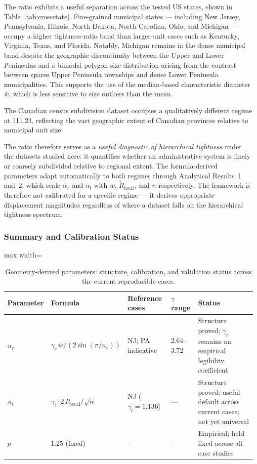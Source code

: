 \documentclass[12pt, a4paper]{article}
\numberwithin{equation}{section}
\begin{document}
The ratio exhibits a useful separation across the tested US states, shown in Table~\ref{tab:crossstate}. Fine-grained municipal states --- including New Jersey, Pennsylvania, Illinois, North Dakota, North Carolina, Ohio, and Michigan --- occupy a higher tightness-ratio band than larger-unit cases such as Kentucky, Virginia, Texas, and Florida. Notably, Michigan remains in the dense municipal band despite the geographic discontinuity between the Upper and Lower Peninsulas and a bimodal polygon size distribution arising from the contrast between sparse Upper Peninsula townships and dense Lower Peninsula municipalities. This supports the use of the median-based characteristic diameter $\bar{w}$, which is less sensitive to size outliers than the mean.

The Canadian census subdivision dataset occupies a qualitatively different regime at 111.23, reflecting the vast geographic extent of Canadian provinces relative to municipal unit size.

The ratio therefore serves as a \emph{useful diagnostic of hierarchical tightness} under the datasets studied here: it quantifies whether an administrative system is finely or coarsely subdivided relative to regional extent. The formula-derived parameters adapt automatically to both regimes through Analytical Results~1 and~2, which scale $\alpha_r$ and $\alpha_l$ with $\bar{w}$, $\widetilde{R}_{\text{local}}$, and $\bar{n}$ respectively. The framework is therefore not calibrated for a specific regime --- it derives appropriate displacement magnitudes regardless of where a dataset falls on the hierarchical tightness spectrum.

\subsubsection{Summary and Calibration Status}

\begin{table}[h]
\centering
\caption{Geometry-derived parameters: structure, calibration, and validation status across the current reproducible cases.}
\label{tab:derived}
\begin{adjustbox}{max width=\textwidth}
\begin{tabular}{lllll}
\toprule
\textbf{Parameter} & \textbf{Formula} & \textbf{Reference cases} & \textbf{$\gamma$ range} & \textbf{Status} \\
\midrule
$\alpha_r$ & $\gamma_r\,\bar{w} / (2\sin(\pi/n_r))$ & NJ; PA indicative & 2.64--3.72 & Structure proved; $\gamma_r$ remains an empirical legibility coefficient \\
$\alpha_l$ & $\gamma_l \cdot 2\,R_{\text{local}} / \sqrt{\bar{n}}$ & NJ ($\gamma_l=1.136$) & --- & Structure proved; useful default across current cases; not yet universal \\
$p$        & 1.25 (fixed) & --- & --- & Empirical; held fixed across all case studies \\
\bottomrule
\end{tabular}
\end{adjustbox}
\end{table}
\end{document}
